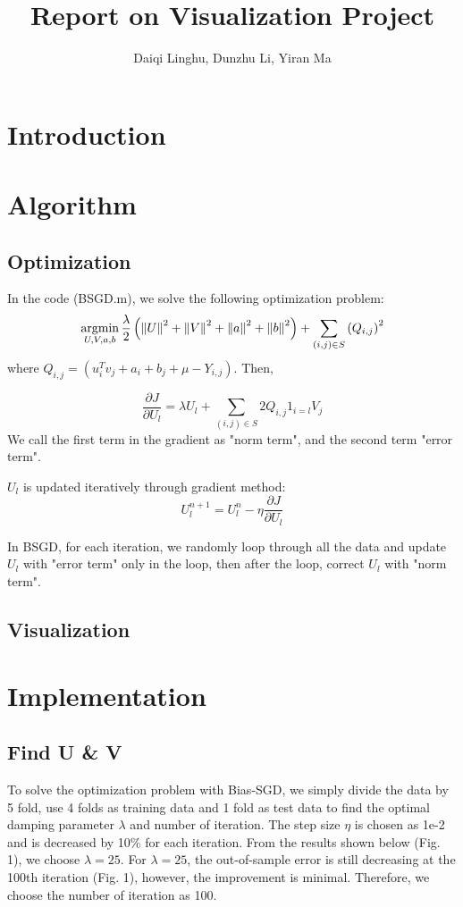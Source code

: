 \documentclass[12pt]{article}
\title{Report on Visualization Project}
\author{Daiqi Linghu, Dunzhu Li, Yiran Ma}
\date{} %
\newcommand{\argmin}{\operatornamewithlimits{argmin}}
\newcommand\norm[1]{\left\lVert#1\right\rVert}
\begin{document}
\maketitle

\section{Introduction}

\section{Algorithm}
\subsection{Optimization}
In the code (BSGD.m), we solve the following optimization problem:
\begin{equation*}
\argmin_{U,V,a,b}\frac{\lambda}{2}\left(\norm{U}^2+\norm{V}^2+\norm{a}^2+\norm{b}^2\right)+
\sum_{(i,j)\in S}\left(  Q_{i,j}  \right)^2
\end{equation*}
where $Q_{i,j}=(u_i^T v_j + a_i + b_j +\mu-Y_{i,j})$. Then,

\begin{equation*}
\frac{\partial{J}}{\partial{U_{l}}}=\lambda U_{l}+\sum_{(i,j)\in S}2Q_{i,j}1_{i=l}V_{j}
\end{equation*}
We call the first term in the gradient as "norm term", and the second term "error term".

$U_{l}$ is updated iteratively through gradient method:
\begin{equation*}
U_{l}^{n+1}=U_{l}^{n}-\eta \frac{\partial{J}}{\partial{U_{l}}}
\end{equation*}

In BSGD, for each iteration, we randomly loop through all the data and update $U_{l}$ with "error term" only in the loop, then after the loop, correct $U_{l}$ with "norm term".

\subsection{Visualization}

\section{Implementation}
\subsection{Find U \& V} 
To solve the optimization problem with Bias-SGD, we simply divide the data by 5 fold, use 4 folds as training data and 1 fold as test data to find the optimal damping parameter $\lambda$  and number of iteration. The step size $\eta$ is chosen as 1e-2 and is decreased by 10\% for each iteration. From the results shown below (Fig. 1), we choose $\lambda=25$. For $\lambda=25$, the out-of-sample error is still decreasing at the 100th iteration (Fig. 1), however, the improvement is minimal. Therefore, we choose the number of iteration as 100.   
\end{document}
